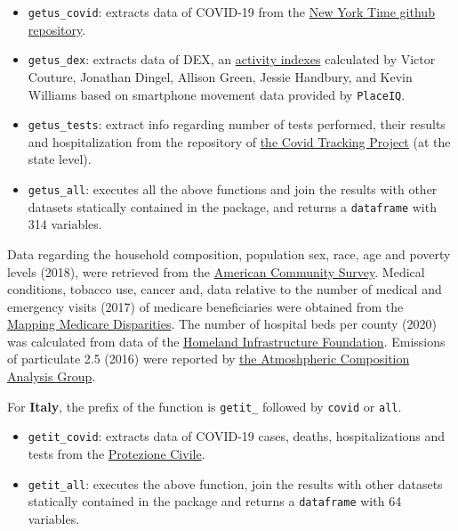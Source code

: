 \documentclass[12pt,halfline,a4paper,]{ouparticle}
\providecommand{\tightlist}{%
  \setlength{\itemsep}{0pt}\setlength{\parskip}{0pt}}
\begin{document}
\begin{itemize}
\tightlist
\item
  \texttt{getus\_covid}: extracts data of COVID-19 from the
  \href{https://github.com/nytimes/covid-19-data}{New York Time github
  repository}.
\item
  \texttt{getus\_dex}: extracts data of DEX, an
  \href{https://github.com/COVIDExposureIndices/COVIDExposureIndices}{activity
  indexes} calculated by Victor Couture, Jonathan Dingel, Allison Green,
  Jessie Handbury, and Kevin Williams based on smartphone movement data
  provided by \texttt{PlaceIQ}.
\item
  \texttt{getus\_tests}: extract info regarding number of tests
  performed, their results and hospitalization from the repository of
  \href{https://covidtracking.com/api\%7D}{the Covid Tracking Project}
  (at the state level).
\item
  \texttt{getus\_all}: executes all the above functions and join the
  results with other datasets statically contained in the package, and
  returns a \texttt{dataframe} with 314 variables.
\end{itemize}

Data regarding the household composition, population sex, race, age and
poverty levels (2018), were retrieved from the
\href{https://data.census.gov/cedsci/table?q=United\%20States}{American
Community Survey}. Medical conditions, tobacco use, cancer and, data
relative to the number of medical and emergency visits (2017) of
medicare beneficiaries were obtained from the
\href{https://data.cms.gov/mapping-medicare-disparities}{Mapping
Medicare Disparities}. The number of hospital beds per county (2020) was
calculated from data of the
\href{https://hifld-geoplatform.opendata.arcgis.com/datasets/hospitals/data?page=18}{Homeland
Infrastructure Foundation}. Emissions of particulate 2.5 (2016) were
reported by
\href{http://fizz.phys.dal.ca/~atmos/martin/?page_id=140\#V4.NA.02.MAPLE}{the
Atmoshpheric Composition Analysis Group}.

For \textbf{Italy}, the prefix of the function is \texttt{getit\_}
followed by \texttt{covid} or \texttt{all}.

\begin{itemize}
\tightlist
\item
  \texttt{getit\_covid}: extracts data of COVID-19 cases, deaths,
  hospitalizations and tests from the
  \href{\%22https://raw.githubusercontent.com/pcm-dpc/COVID-19/master/dati-regioni/dpc-covid19-ita-regioni.csv\%22}{Protezione
  Civile}.
\item
  \texttt{getit\_all}: executes the above function, join the results
  with other datasets statically contained in the package and returns a
  \texttt{dataframe} with 64 variables.
\end{itemize}
\end{document}

